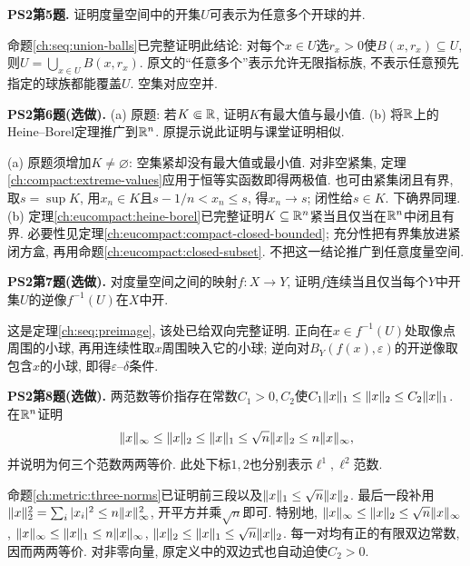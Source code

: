 \begin{exercise}\label{ps190:2:5}
\textbf{PS2第5题.} 证明度量空间中的开集$U$可表示为任意多个开球的并.
\end{exercise}
\begin{solution}
命题\ref{ch:seq:union-balls}已完整证明此结论: 对每个$x\in U$选$r_x>0$使$B(x,r_x)\subseteq U$, 则$U=\bigcup_{x\in U}B(x,r_x)$. 原文的“任意多个”表示允许无限指标族, 不表示任意预先指定的球族都能覆盖$U$. 空集对应空并.
\end{solution}

\begin{exercise}\label{ps190:2:6}
\textbf{PS2第6题(选做).} (a) 原题: 若$K\Subset\mathbb R$, 证明$K$有最大值与最小值. (b) 将$\mathbb R$上的Heine--Borel定理推广到$\mathbb R^n$. 原提示说此证明与课堂证明相似.
\end{exercise}
\begin{solution}
(a) 原题须增加$K\ne\varnothing$: 空集紧却没有最大值或最小值. 对非空紧集, 定理\ref{ch:compact:extreme-values}应用于恒等实函数即得两极值. 也可由紧集闭且有界, 取$s=\sup K$, 用$x_n\in K$且$s-1/n<x_n\le s$, 得$x_n\to s$; 闭性给$s\in K$. 下确界同理. (b) 定理\ref{ch:eucompact:heine-borel}已完整证明$K\subseteq\mathbb R^n$紧当且仅当在$\mathbb R^n$中闭且有界. 必要性见定理\ref{ch:eucompact:compact-closed-bounded}; 充分性把有界集放进紧闭方盒, 再用命题\ref{ch:eucompact:closed-subset}. 不把这一结论推广到任意度量空间.
\end{solution}

\begin{exercise}\label{ps190:2:7}
\textbf{PS2第7题(选做).} 对度量空间之间的映射$f:X\to Y$, 证明$f$连续当且仅当每个$Y$中开集$U$的逆像$f^{-1}(U)$在$X$中开.
\end{exercise}
\begin{solution}
这是定理\ref{ch:seq:preimage}, 该处已给双向完整证明. 正向在$x\in f^{-1}(U)$处取像点周围的小球, 再用连续性取$x$周围映入它的小球; 逆向对$B_Y(f(x),\varepsilon)$的开逆像取包含$x$的小球, 即得$\varepsilon$--$\delta$条件.
\end{solution}

\begin{exercise}\label{ps190:2:8}
\textbf{PS2第8题(选做).} 两范数等价指存在常数$C_1>0,C_2$使$C_1\lVert x\rVert_1\le\lVert x\rVert_2\le C_2\lVert x\rVert_1$. 在$\mathbb R^n$证明
\[
 \lVert x\rVert_\infty\le\lVert x\rVert_2\le\lVert x\rVert_1
 \le\sqrt n\lVert x\rVert_2\le n\lVert x\rVert_\infty,
\]
并说明为何三个范数两两等价. 此处下标$1,2$也分别表示$\ell^1,\ell^2$范数.
\end{exercise}
\begin{solution}
命题\ref{ch:metric:three-norms}已证明前三段以及$\lVert x\rVert_1\le\sqrt n\lVert x\rVert_2$. 最后一段补用$\lVert x\rVert_2^2=\sum_i|x_i|^2\le n\lVert x\rVert_\infty^2$, 开平方并乘$\sqrt n$即可. 特别地, $\lVert x\rVert_\infty\le\lVert x\rVert_2\le\sqrt n\lVert x\rVert_\infty$, $\lVert x\rVert_\infty\le\lVert x\rVert_1\le n\lVert x\rVert_\infty$, $\lVert x\rVert_2\le\lVert x\rVert_1\le\sqrt n\lVert x\rVert_2$. 每一对均有正的有限双边常数, 因而两两等价. 对非零向量, 原定义中的双边式也自动迫使$C_2>0$.
\end{solution}


